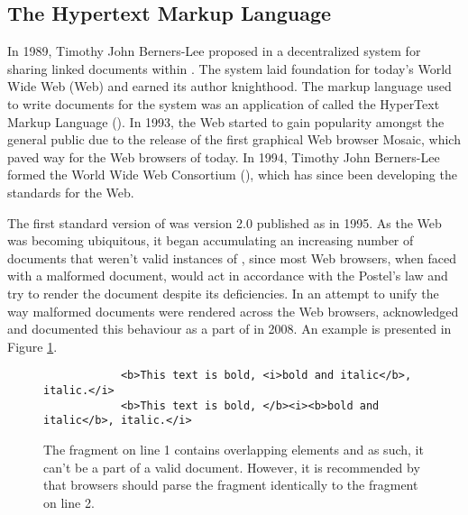 \documentclass{book}
\begin{document}
      \subsection{The Hypertext Markup Language}
        In 1989, Timothy John Berners-Lee proposed in \cite{bernerslee89} a
        decentralized system for sharing linked documents within .
        The system laid foundation for today's World Wide Web (Web) and earned
        its author knighthood. The markup language used to write documents for
        the system was an application of  called the HyperText
        Markup Language (). In 1993, the Web started to gain
        popularity amongst the general public due to the release of the first
        graphical Web browser Mosaic, which paved way for the Web browsers of
        today. In 1994, Timothy John Berners-Lee formed the World Wide Web
        Consortium (), which has since been developing the
        standards for the Web.
        
        The first standard version of  was version 2.0 published
        as \cite{rfc1866} in 1995. As the Web was becoming ubiquitous, it began
        accumulating an increasing number of documents that weren't valid
        instances of , since most Web browsers, when faced with a
        malformed document, would act in accordance with the Postel's law and
        try to render the document despite its deficiencies. In an attempt to
        unify the way malformed  documents were rendered across
        the Web browsers,  acknowledged and documented this
        behaviour as a part of \cite[Section~8.2, Parsing HTML
        documents]{hickson14} in 2008. An example is presented in Figure
        \ref{fig:overlapping-elements}.

        \begin{figure}[b]
          \begin{verbatim}
            <b>This text is bold, <i>bold and italic</b>, italic.</i>
            <b>This text is bold, </b><i><b>bold and italic</b>, italic.</i>
          \end{verbatim}
          \caption{The fragment on line 1 contains overlapping elements and as
            such, it can't be a part of a valid  document.
            However, it is recommended by  that browsers should
            parse the fragment identically to the fragment on line 2.}
          \label{fig:overlapping-elements}
        \end{figure}
\end{document}
